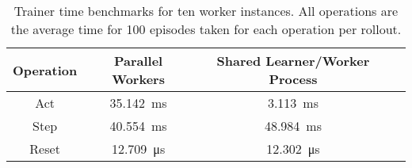 \documentclass[11pt]{article}
\begin{document}
    \begin{table}[h!]
        \centering
        \begin{tabular}{|c|c|c|c|}
            \hline
            \textbf{Operation} & \textbf{Parallel Workers} & \textbf{Shared Learner/Worker Process} \\
            \hline

            Act & \SI{35.142}{\milli\second} & \SI{3.113}{\milli\second} \\
            Step & \SI{40.554}{\milli\second} &\SI{48.984}{\milli\second} \\
            Reset & \SI{12.709}{\micro\second} & \SI{12.302}{\micro\second} \\
            \hline
        \end{tabular}
        \caption{Trainer time benchmarks for ten worker instances. All operations are the average time for 100 episodes taken for each operation per rollout.}
        \label{tab:table}
    \end{table}
\end{document}
